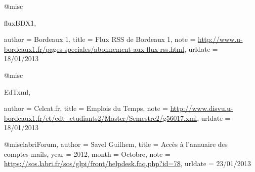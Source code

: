 @misc{fluxBDX1,

author = {Bordeaux 1},
title = {Flux {RSS} de {B}ordeaux 1},
note = {\url{http://www.u-bordeaux1.fr/pages-speciales/abonnement-aux-flux-rss.html}},
urldate = {18/01/2013}
}

@misc{EdTxml,

author = {Celcat.fr},
title = {Emplois du Temps},
note = {\url{http://www.disvu.u-bordeaux1.fr/et/edt_etudiants2/Master/Semestre2/g56017.xml}},
urldate = {18/01/2013}
}

@misc{labriForum,
  author = {Savel Guilhem},
  title = {Accès à l'annuaire des comptes mails},
  year = {2012},
  month = {Octobre},
  note = {\url{https://sos.labri.fr/sos/glpi/front/helpdesk.faq.php?id=78}},
  urldate = {23/01/2013}
}

